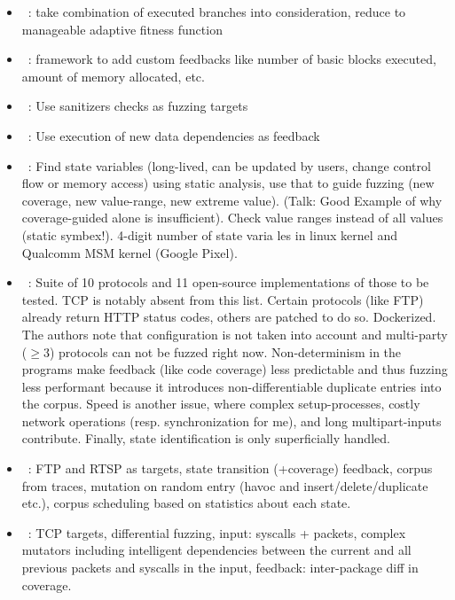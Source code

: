 \documentclass{article}
\let\savedCite=\cite
\renewcommand{\cite}{\unskip~\savedCite}
\begin{document}
\begin{multicols}{2}
\begin{itemize}
    \item {}\cite{Ankou}: take combination of executed branches into consideration, reduce to manageable adaptive fitness function
    \item {}\cite{FuzzFactory}: framework to add custom feedbacks like number of basic blocks executed, amount of memory allocated, etc.
    \item {}\cite{ParmeSan}: Use sanitizers checks as fuzzing targets
    \item {}\cite{DDFuzz}: Use execution of new data dependencies as feedback
    \item {}\cite{StateFuzz}: Find state variables (long-lived, can be updated by users, change control flow or memory access) using static analysis, use that to guide fuzzing (new coverage, new value-range, new extreme value). (Talk: Good Example of why coverage-guided alone is insufficient). Check value ranges instead of all values (static symbex!). 4-digit number of state varia les in linux kernel and Qualcomm MSM kernel (Google Pixel).
    \item {}\cite{ProFuzzBench}: Suite of 10 protocols and 11 open-source implementations of those to be tested. TCP is notably absent from this list. Certain protocols (like FTP) already return HTTP status codes, others are patched to do so. Dockerized. The authors note that configuration is not taken into account and multi-party ($\geq 3$) protocols can not be fuzzed right now. Non-determinism in the programs make feedback (like code coverage) less predictable and thus fuzzing less performant because it introduces non-differentiable duplicate entries into the corpus. Speed is another issue, where complex setup-processes, costly network operations (resp. synchronization for me), and long multipart-inputs contribute. Finally, state identification is only superficially handled.
    \item {}\cite{AFLNET}: FTP and RTSP as targets, state transition (+coverage) feedback, corpus from traces, mutation on random entry (havoc and insert/delete/duplicate etc.), corpus scheduling based on statistics about each state.
    \item {}\cite{TCPFuzz}: TCP targets, differential fuzzing, input: syscalls + packets, complex mutators including intelligent dependencies between the current and all previous packets and syscalls in the input, feedback: inter-package diff in coverage.

\end{itemize}
\end{multicols}
\end{document}
